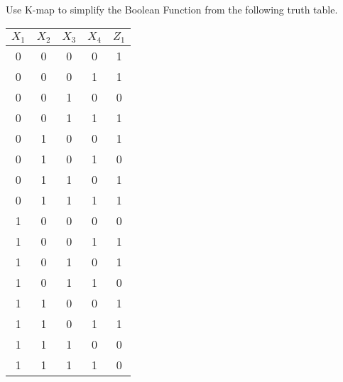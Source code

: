 \begin{exercise}
	Use K-map to simplify the Boolean Function from the following truth table.
	\begin{table}[H]
		\centering
		\begin{tabular}{|c|c|c|c||c|}
			\hline
			\( X_1 \) & \( X_2 \) & \( X_3 \) & \( X_4 \) & \( Z_1 \) \\
			\hline
			0 & 0 & 0 & 0 & 1 \\
			0 & 0 & 0 & 1 & 1 \\
			0 & 0 & 1 & 0 & 0 \\
			0 & 0 & 1 & 1 & 1 \\
			0 & 1 & 0 & 0 & 1 \\
			0 & 1 & 0 & 1 & 0 \\
			0 & 1 & 1 & 0 & 1 \\
			0 & 1 & 1 & 1 & 1 \\
			1 & 0 & 0 & 0 & 0 \\
			1 & 0 & 0 & 1 & 1 \\
			1 & 0 & 1 & 0 & 1 \\
			1 & 0 & 1 & 1 & 0 \\
			1 & 1 & 0 & 0 & 1 \\
			1 & 1 & 0 & 1 & 1 \\
			1 & 1 & 1 & 0 & 0 \\
			1 & 1 & 1 & 1 & 0 \\
			\hline
		\end{tabular}
	\end{table}
\end{exercise}
